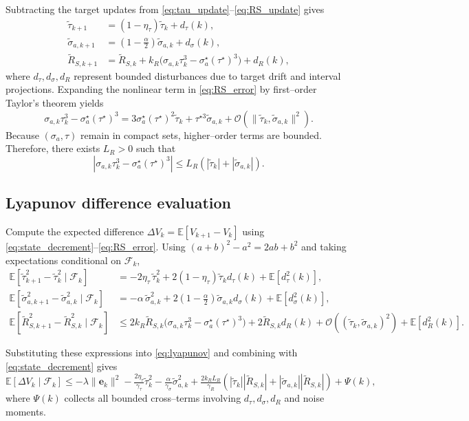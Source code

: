 \documentclass[10pt]{extarticle}
\begin{document}
Subtracting the target updates from \eqref{eq:tau_update}–\eqref{eq:RS_update} gives
\begin{align}
\tilde\tau_{k+1}
&= (1-\eta_\tau)\tilde\tau_k + d_\tau(k),
\label{eq:tau_error}\\
\tilde\sigma_{a,k+1}
&= (1-\tfrac{\alpha}{2})\tilde\sigma_{a,k} + d_\sigma(k),
\label{eq:sigma_error}\\
\tilde R_{S,k+1}
&= \tilde R_{S,k} + k_R
\bigl(\sigma_{a,k}\tau_k^3 - \sigma_a^\star (\tau^\star)^3\bigr)
+ d_R(k),
\label{eq:RS_error}
\end{align}
where $d_\tau,d_\sigma,d_R$ represent bounded disturbances due to target drift and interval projections.
Expanding the nonlinear term in \eqref{eq:RS_error} by first–order Taylor’s theorem yields
\[
\sigma_{a,k}\tau_k^3 - \sigma_a^\star (\tau^\star)^3
= 3\sigma_a^\star (\tau^\star)^2 \tilde\tau_k + \tau^{\star 3} \tilde\sigma_{a,k} + \mathcal{O}(\|\tilde\tau_k,\tilde\sigma_{a,k}\|^2).
\]
Because $(\sigma_a,\tau)$ remain in compact sets, higher–order terms are bounded.
Therefore, there exists $L_R>0$ such that
\[
|\sigma_{a,k}\tau_k^3 - \sigma_a^\star (\tau^\star)^3| \le L_R(|\tilde\tau_k|+|\tilde\sigma_{a,k}|).
\]

\subsection{Lyapunov difference evaluation}

Compute the expected difference $\Delta V_k = \mathbb{E}[V_{k+1}-V_k]$ using
\eqref{eq:state_decrement}–\eqref{eq:RS_error}.
Using $(a+b)^2-a^2 = 2a b + b^2$ and taking expectations conditional on $\mathcal F_k$,
\begin{align}
\mathbb{E}[\tilde\tau_{k+1}^2 - \tilde\tau_k^2 \mid \mathcal F_k]
&= -2\eta_\tau\,\tilde\tau_k^2 + 2(1-\eta_\tau)\tilde\tau_k d_\tau(k) + \mathbb{E}[d_\tau^2(k)], \\
\mathbb{E}[\tilde\sigma_{a,k+1}^2 - \tilde\sigma_{a,k}^2 \mid \mathcal F_k]
&= -\alpha\,\tilde\sigma_{a,k}^2 + 2(1-\tfrac{\alpha}{2})\tilde\sigma_{a,k} d_\sigma(k) + \mathbb{E}[d_\sigma^2(k)], \\
\mathbb{E}[\tilde R_{S,k+1}^2 - \tilde R_{S,k}^2 \mid \mathcal F_k]
&\le 2 k_R \tilde R_{S,k}
\bigl(\sigma_{a,k}\tau_k^3 - \sigma_a^\star (\tau^\star)^3\bigr)
+ 2\tilde R_{S,k} d_R(k)
+ \mathcal{O}((\tilde\tau_k,\tilde\sigma_{a,k})^2)
+ \mathbb{E}[d_R^2(k)].
\end{align}

Substituting these expressions into \eqref{eq:lyapunov} and combining with
\eqref{eq:state_decrement} gives
\begin{equation}
\mathbb{E}[\Delta V_k \mid \mathcal F_k]
\le -\lambda \|\boldsymbol{e}_k\|^2
- \tfrac{2\eta_\tau}{\gamma_\tau}\tilde\tau_k^2
- \tfrac{\alpha}{\gamma_\sigma}\tilde\sigma_{a,k}^2
+ \tfrac{2 k_R L_R}{\gamma_R}
(|\tilde\tau_k||\tilde R_{S,k}| + |\tilde\sigma_{a,k}||\tilde R_{S,k}|)
+ \Psi(k),
\label{eq:deltaV_bound}
\end{equation}
where $\Psi(k)$ collects all bounded cross–terms involving $d_\tau,d_\sigma,d_R$ and noise moments.
\end{document}
